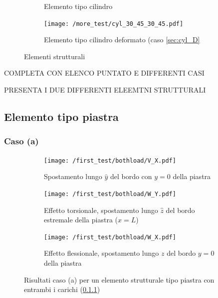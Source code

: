 \documentclass[a4paper,num-refs]{oup-contemporary}
\begin{document}
\begin{figure}[bt!]
\begin{subfigure}[t]{0.24\textwidth}
\caption{Elemento tipo cilindro}
		\label{fig:three sin x}
	\end{subfigure}
	\hfill
	\begin{subfigure}[t]{0.24\textwidth}
	\centering
 \texttt{[image: /more\_test/cyl\_30\_45\_30\_45.pdf]}
	\caption{Elemento tipo cilindro deformato (caso \cref{sec:cyl_D}}
	\label{fig:five ove x}
\end{subfigure}
	\hfill
	\caption{Elementi strutturali}
	\label{fig:three graphs}
\end{figure}



COMPLETA CON ELENCO PUNTATO E DIFFERENTI CASI 

PRESENTA I DUE DIFFERENTI ELEEMTNI STRUTTURALI
\textcolor{blue}{\lipsum[1-2]}





\subsection{Elemento tipo piastra}
\subsubsection{Caso (a)}
\label{sec:plate_A}

\begin{figure}[bt!]
	\centering

	\begin{subfigure}[t]{0.3\textwidth}
		\centering
		\texttt{[image: /first\_test/bothload/V\_X.pdf]}
		\caption{Spostamento lungo $\hat y$ del bordo con $y=0$ della piastra}
		
	\end{subfigure}
	\hfill
	\begin{subfigure}[t]{0.3\textwidth}
		\centering
\texttt{[image: /first\_test/bothload/W\_Y.pdf]}
		
		\caption{Effetto torsionale, spostamento lungo $\hat z$ del bordo estremale della piastra ($x=L$)}
		
	\end{subfigure}
	\hfill
	\begin{subfigure}[t]{0.3\textwidth}
		\centering
		\texttt{[image: /first\_test/bothload/W\_X.pdf]}
		\caption{Effetto flessionale, spostamento lungo $z$ del bordo $y=0$ della piastra}
		
	\end{subfigure}
	\hfill
	\caption{Risultati caso (a) per un elemento strutturale tipo piastra con entrambi i carichi (\cref{sec:plate_A})}
	\label{fig:plate_A_both_load}
\end{figure}
\end{document}
